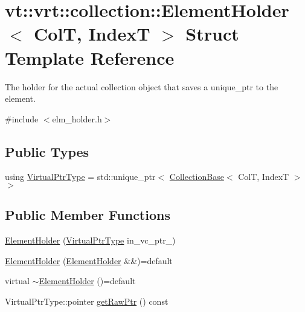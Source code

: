 \hypertarget{structvt_1_1vrt_1_1collection_1_1_element_holder}{}\section{vt\+:\+:vrt\+:\+:collection\+:\+:Element\+Holder$<$ ColT, IndexT $>$ Struct Template Reference}
\label{structvt_1_1vrt_1_1collection_1_1_element_holder}


The holder for the actual collection object that saves a unique\+\_\+ptr to the element.  




{\ttfamily \#include $<$elm\+\_\+holder.\+h$>$}

\subsection*{Public Types}
\begin{DoxyCompactItemize}
\item 
using \hyperlink{structvt_1_1vrt_1_1collection_1_1_element_holder_afc12d1a71ec8f735f1b7fe12a067c8a6}{Virtual\+Ptr\+Type} = std\+::unique\+\_\+ptr$<$ \hyperlink{structvt_1_1vrt_1_1collection_1_1_collection_base}{Collection\+Base}$<$ ColT, IndexT $>$ $>$
\end{DoxyCompactItemize}
\subsection*{Public Member Functions}
\begin{DoxyCompactItemize}
\item 
\hyperlink{structvt_1_1vrt_1_1collection_1_1_element_holder_ad8d672e74c498a661fa251bcad5cf148}{Element\+Holder} (\hyperlink{structvt_1_1vrt_1_1collection_1_1_element_holder_afc12d1a71ec8f735f1b7fe12a067c8a6}{Virtual\+Ptr\+Type} in\+\_\+vc\+\_\+ptr\+\_\+)
\item 
\hyperlink{structvt_1_1vrt_1_1collection_1_1_element_holder_acc214e54954edc0d8112c59ea7e51c02}{Element\+Holder} (\hyperlink{structvt_1_1vrt_1_1collection_1_1_element_holder}{Element\+Holder} \&\&)=default
\item 
virtual \hyperlink{structvt_1_1vrt_1_1collection_1_1_element_holder_ab74327ed9bdbe171d7feab3a1efb8d63}{$\sim$\+Element\+Holder} ()=default
\item 
Virtual\+Ptr\+Type\+::pointer \hyperlink{structvt_1_1vrt_1_1collection_1_1_element_holder_a3db2beb1053f1da4abe1944e0aa33129}{get\+Raw\+Ptr} () const
\end{DoxyCompactItemize}
